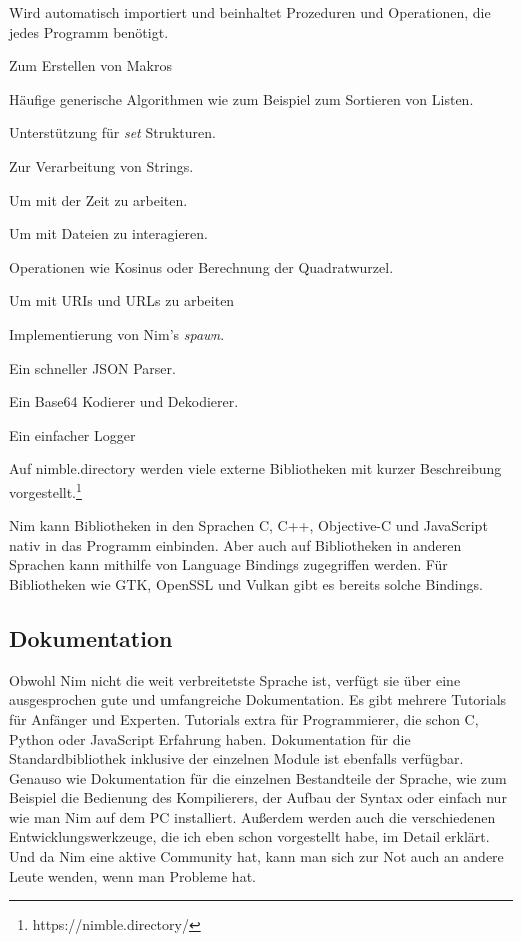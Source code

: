 \documentclass[11pt]{report}
\begin{document}
\begin{description}
\addtolength{\itemindent}{0.60cm}
\item[system] Wird automatisch importiert und beinhaltet Prozeduren und Operationen, die jedes Programm benötigt.
\item[macros] Zum Erstellen von Makros
\item[algorithm] Häufige generische Algorithmen wie zum Beispiel zum Sortieren von Listen.
\item[set] Unterstützung für \emph{set} Strukturen.
\item[strutils] Zur Verarbeitung von Strings.
\item[times] Um mit der Zeit zu arbeiten.
\item[files] Um mit Dateien zu interagieren.
\item[math] Operationen wie Kosinus oder Berechnung der Quadratwurzel.
\item[uri] Um mit URIs und URLs zu arbeiten
\item[threadpool] Implementierung von Nim's \emph{spawn}.
\item[json] Ein schneller JSON Parser.
\item[base64] Ein Base64 Kodierer und Dekodierer.
\item[logging] Ein einfacher Logger
\end{description}

Auf nimble.directory werden viele externe Bibliotheken mit kurzer Beschreibung vorgestellt.\footnote{https://nimble.directory/}

Nim kann Bibliotheken in den Sprachen C, C++, Objective-C und JavaScript nativ in das Programm einbinden. Aber auch auf Bibliotheken in anderen Sprachen kann mithilfe von Language Bindings zugegriffen werden. Für Bibliotheken wie GTK, OpenSSL und Vulkan gibt es bereits solche Bindings.


\subsection{Dokumentation}
Obwohl Nim nicht die weit verbreitetste Sprache ist, verfügt sie über eine ausgesprochen gute und umfangreiche Dokumentation.
Es gibt mehrere Tutorials für Anfänger und Experten. Tutorials extra für Programmierer, die schon C, Python oder JavaScript Erfahrung haben. Dokumentation für die Standardbibliothek inklusive der einzelnen Module ist ebenfalls verfügbar.
Genauso wie Dokumentation für die einzelnen Bestandteile der Sprache, wie zum Beispiel die Bedienung des Kompilierers, der Aufbau der Syntax oder einfach nur wie man Nim auf dem PC installiert.
Außerdem werden auch die verschiedenen Entwicklungswerkzeuge, die ich eben schon vorgestellt habe, im Detail erklärt.
Und da Nim eine aktive Community hat, kann man sich zur Not auch an andere Leute wenden, wenn man Probleme hat.
\end{document}
